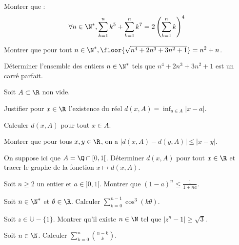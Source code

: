 \documentclass[11pt,a4paper]{article}
\begin{document}
\begin{exercise}
Montrer que :\\
$$\forall n\in\N^*, \sum_{k=1}^nk^5+\sum_{k=1}^nk^7=2\left(\sum_{k=1}^nk\right)^4$$
\end{exercise}

\begin{exercise}
\begin{questions}
\item Montrer que pour tout $n\in\N^*, \floor{\sqrt{n^4+2n^3+3n^2+1}}=n^2+n$.
\item Déterminer l'ensemble des entiers $n\in\N^*$ tels que $n^4+2n^3+3n^2+1$ est un carré parfait.
\end{questions}
\end{exercise}

\begin{exercise}
\begin{questions}
\item Soit $A\subset\R$ non vide.
\begin{questions}
\item Justifier pour $x\in\R$ l'existence du réel $d(x,A)=\inf_{a\in A}|x-a|$.
\item Calculer $d(x,A)$ pour tout $x\in A$.
\item Montrer que pour tous $x,y\in\R$, on a $|d(x,A)-d(y,A)|\le|x-y|$.
\end{questions}
\item On suppose ici que $A=\Q\cap[0,1[$. Déterminer $d(x,A)$ pour tout $x\in\R$ et tracer le graphe de la fonction $x\mapsto d(x,A)$.
\end{questions}
\end{exercise}

\begin{exercise}
Soit $n \ge 2$ un entier et $a \in ]0,1[$. Montrer que $(1-a)^n \le \frac{1}{1+na}$.
\end{exercise}

\begin{exercise}
Soit $n\in\N^*$ et $\theta\in\R$. Calculer $\displaystyle\sum_{k=0}^{n-1}\cos^3(k\theta)$.
\end{exercise}

\begin{exercise}
Soit $z\in \mathbb{U} - \{1\}$. Montrer qu'il existe $n\in\N$ tel que $\left| z^n - 1 \right| \ge \sqrt{3}$.
\end{exercise}

\begin{exercise}
Soit $n\in\N$. Calculer $\displaystyle\sum_{k=0}^{n}\binom{n-k}{k}$.
\end{exercise}
\end{document}
